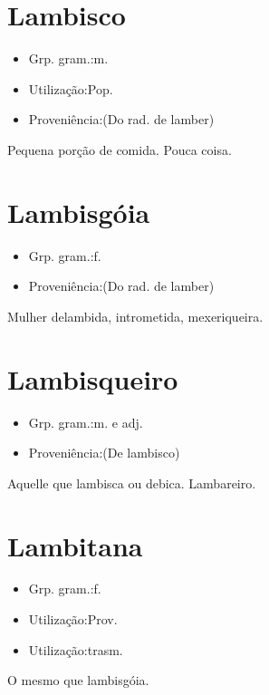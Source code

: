 \section{Lambisco}
\begin{itemize}
\item {Grp. gram.:m.}
\end{itemize}
\begin{itemize}
\item {Utilização:Pop.}
\end{itemize}
\begin{itemize}
\item {Proveniência:(Do rad. de \textunderscore lamber\textunderscore )}
\end{itemize}
Pequena porção de comida.
Pouca coisa.
\section{Lambisgóia}
\begin{itemize}
\item {Grp. gram.:f.}
\end{itemize}
\begin{itemize}
\item {Proveniência:(Do rad. de \textunderscore lamber\textunderscore )}
\end{itemize}
Mulher delambida, intrometida, mexeriqueira.
\section{Lambisqueiro}
\begin{itemize}
\item {Grp. gram.:m.  e  adj.}
\end{itemize}
\begin{itemize}
\item {Proveniência:(De \textunderscore lambisco\textunderscore )}
\end{itemize}
Aquelle que lambisca ou debica.
Lambareiro.
\section{Lambitana}
\begin{itemize}
\item {Grp. gram.:f.}
\end{itemize}
\begin{itemize}
\item {Utilização:Prov.}
\end{itemize}
\begin{itemize}
\item {Utilização:trasm.}
\end{itemize}
O mesmo que \textunderscore lambisgóia\textunderscore .
